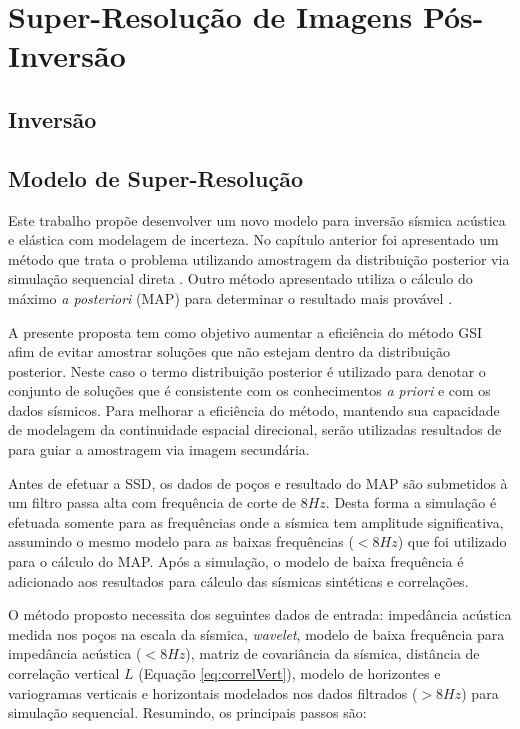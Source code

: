 \chapter{Super-Resolução de Imagens Pós-Inversão}
\label{cap:3modeloHibrido}

\section{Inversão}


\section{Modelo de Super-Resolução}

Este trabalho propõe desenvolver um novo modelo para inversão sísmica acústica e
elástica com modelagem de incerteza. No capítulo anterior foi apresentado um
método que trata o problema utilizando amostragem da distribuição posterior via
simulação sequencial direta \citep{amilcarInversao}. Outro método apresentado
utiliza o cálculo do máximo \textit{a posteriori} (MAP) para determinar o
resultado mais provável \citep{Buland01012003}.

A presente proposta tem como objetivo aumentar a eficiência do método GSI
\citep{amilcarInversao} afim de evitar amostrar soluções que não estejam dentro
da distribuição posterior. Neste caso o termo distribuição posterior é utilizado
para denotar o conjunto de soluções que é consistente com os conhecimentos
\textit{a priori} e com os dados sísmicos. Para melhorar a eficiência do método,
mantendo sua capacidade de modelagem da continuidade espacial direcional, serão
utilizadas resultados de \cite{Buland01012003} para guiar a amostragem via
imagem secundária.

Antes de efetuar a SSD, os dados de poços e resultado do MAP são submetidos à um
filtro passa alta com frequência de corte de $8Hz$. Desta forma a simulação é
efetuada somente para as frequências onde a sísmica tem amplitude significativa,
assumindo o mesmo modelo para as baixas frequências ($<8Hz$) que foi utilizado
para o cálculo do MAP. Após a simulação, o modelo de baixa frequência é
adicionado aos resultados para cálculo das sísmicas sintéticas e correlações.

O método proposto necessita dos seguintes dados de entrada: impedância acústica
medida nos poços na escala da sísmica, \textit{wavelet}, modelo de baixa
frequência para impedância acústica ($<8Hz$), matriz de covariância da sísmica,
distância de correlação vertical $L$ (Equação \ref{eq:correlVert}), modelo de
horizontes e variogramas verticais e horizontais modelados nos dados filtrados
($>8Hz$) para simulação sequencial. Resumindo, os principais passos são:


